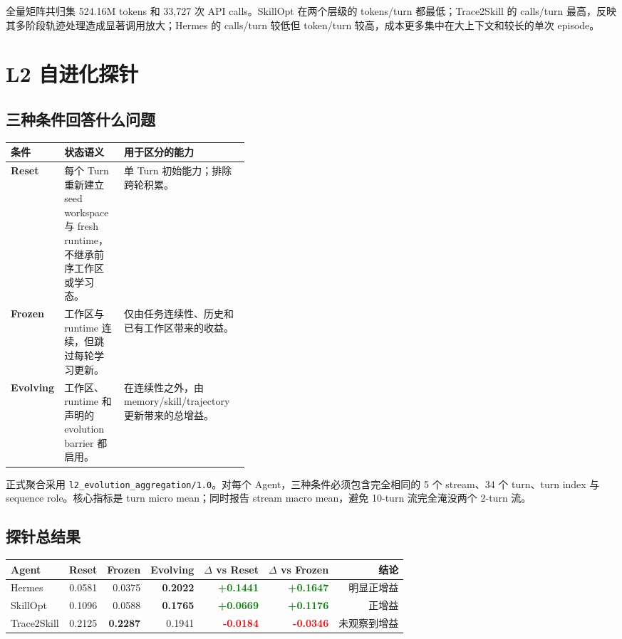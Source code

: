 \documentclass[11pt,a4paper]{article}
\newcommand{\code}[1]{\texttt{#1}}
\newcommand{\pos}[1]{\textcolor{green}{\textbf{+#1}}}
\newcommand{\negv}[1]{\textcolor{red}{\textbf{-#1}}}
\begin{document}
全量矩阵共归集 524.16M tokens 和 33,727 次 API calls。SkillOpt 在两个层级的 tokens/turn 都最低；Trace2Skill 的 calls/turn 最高，反映其多阶段轨迹处理造成显著调用放大；Hermes 的 calls/turn 较低但 token/turn 较高，成本更多集中在大上下文和较长的单次 episode。

\section{L2 自进化探针}

\subsection{三种条件回答什么问题}

\begin{center}
\renewcommand{\arraystretch}{1.25}
\begin{tabularx}{0.98\linewidth}{>{\bfseries}p{0.14\linewidth}p{0.25\linewidth}X}
\toprule
条件 & 状态语义 & 用于区分的能力 \\
\midrule
Reset & 每个 Turn 重新建立 seed workspace 与 fresh runtime，不继承前序工作区或学习态。 & 单 Turn 初始能力；排除跨轮积累。\\
Frozen & 工作区与 runtime 连续，但跳过每轮学习更新。 & 仅由任务连续性、历史和已有工作区带来的收益。\\
Evolving & 工作区、runtime 和声明的 evolution barrier 都启用。 & 在连续性之外，由 memory/skill/trajectory 更新带来的总增益。\\
\bottomrule
\end{tabularx}
\end{center}

正式聚合采用 \code{l2\_evolution\_aggregation/1.0}。对每个 Agent，三种条件必须包含完全相同的 5 个 stream、34 个 turn、turn index 与 sequence role。核心指标是 turn micro mean；同时报告 stream macro mean，避免 10-turn 流完全淹没两个 2-turn 流。

\subsection{探针总结果}

\begin{center}
\renewcommand{\arraystretch}{1.25}
\setlength{\tabcolsep}{7pt}
\begin{tabular}{lrrrrrr}
\toprule
Agent & Reset & Frozen & Evolving & $\Delta$ vs Reset & $\Delta$ vs Frozen & 结论 \\
\midrule
Hermes & 0.0581 & 0.0375 & \textbf{0.2022} & \pos{0.1441} & \pos{0.1647} & 明显正增益 \\
SkillOpt & 0.1096 & 0.0588 & \textbf{0.1765} & \pos{0.0669} & \pos{0.1176} & 正增益 \\
Trace2Skill & 0.2125 & \textbf{0.2287} & 0.1941 & \negv{0.0184} & \negv{0.0346} & 未观察到增益 \\
\bottomrule
\end{tabular}
\end{center}
\end{document}

